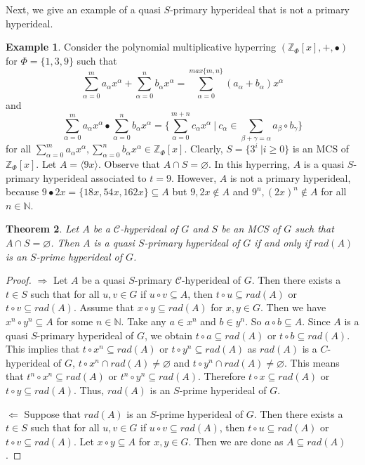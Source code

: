 \documentclass[preprint,review,10pt]{amsart}
\newtheorem{theorem}{Theorem}[section]
\theoremstyle{definition}
\newtheorem{example}[theorem]{Example}
\theoremstyle{remark}
\numberwithin{equation}{section}
\begin{document}
Next, we give an example of a quasi $S$-primary hyperideal that is not a primary hyperideal.
\begin{example} \label{salami}
Consider the polynomial multiplicative hyperring $(\mathbb{Z}_{\Phi}[x],+,\bullet)$ for $\Phi=\{1,3,9\}$ such that 
\[\sum_{\alpha=0}^m a_{\alpha}x^{\alpha}+\sum_{\alpha=0}^n b_{\alpha}x^{\alpha}=\sum_{\alpha=0}^{max\{m,n\}} (a_{\alpha}+b_{\alpha})x^{\alpha}\]
and
\[\sum_{\alpha=0}^m a_{\alpha}x^{\alpha}\bullet\sum_{\alpha=0}^n b_{\alpha}x^{\alpha}=\{\sum_{\alpha=0}^{m+n} c_{\alpha}x^{\alpha} \ \vert \ c_{\alpha} \in \sum_{\beta+\gamma={\alpha}} a_{\beta} \circ b_{\gamma}\}\]
for all $\sum_{\alpha=0}^m a_{\alpha}x^{\alpha}, \sum_{\alpha=0}^n b_{\alpha}x^{\alpha} \in \mathbb{Z}_{\Phi}[x]$. Clearly, $S=\{3^i \ \vert i \geq 0 \}$ is an MCS of $\mathbb{Z}_{\Phi}[x]$. Let $A=\langle 9x \rangle$.   Observe that $A \cap S=\varnothing$. In this hyperring, $A$ is a quasi $S$-primary hyperideal associated to $t=9$. However, $A$ is not a primary hyperideal, because $9 \bullet 2x=\{18x,54x,162x\} \subseteq A$ but $9,2x \notin A$ and $9^n, (2x)^n \notin A$ for all $n \in \mathbb{N}$.
\end{example}
\begin{theorem} \label{11}
Let $A$ be a  $\mathcal{C}$-hyperideal of $G$ and $S$ be an MCS of $G$ such that $A \cap S=\varnothing$. Then  $A$ is a quasi $S$-primary hyperideal of $G$ if and only if  $rad(A)$ is an $S$-prime hyperideal of $G$. 
\end{theorem}
\begin{proof}
$\Longrightarrow$  Let $A$ be a quasi $S$-primary $\mathcal{C}$-hyperideal of $G$. Then there exists a $t \in S$ such that for all $u,v \in G$ if $u \circ v \subseteq A$, then $t \circ u \subseteq rad(A)$ or $t \circ v \subseteq rad(A)$. Assume that $x\circ y \subseteq rad(A)$ for $x,y \in G$. Then we have $x^n \circ y^n \subseteq A$ for some $n \in \mathbb{N}$. Take any $a \in x^n$ and $b \in y^n$. So $a \circ b \subseteq A$. Since  $A$ is a quasi $S$-primary hyperideal of $G$, we obtain $t \circ a \subseteq rad(A)$ or $t \circ b \subseteq rad(A)$.  This implies that $t \circ x^n \subseteq rad(A)$ or $t \circ y^n \subseteq rad(A)$ as $rad(A)$ is a $C$-hyperideal of $G$, $t \circ x^n \cap rad(A) \neq \varnothing$ and $t \circ y^n \cap rad(A) \neq \varnothing$. This means that $t^n \circ x^n \subseteq rad(A)$ or $t^n \circ y^n \subseteq rad(A)$. Therefore $t \circ x \subseteq rad(A)$ or $t \circ y \subseteq rad(A)$. Thus, $rad(A)$ is an $S$-prime hyperideal of $G$. 

$\Longleftarrow$  Suppose that $rad(A)$ is an $S$-prime hyperideal of $G$. Then there exists a $t \in S$ such that for all $u,v \in G$ if $u \circ v \subseteq rad(A)$, then $t \circ u \subseteq rad(A)$ or $t \circ v \subseteq rad(A)$. Let $x \circ y \subseteq A$ for $x,y \in G$. Then we are done as $A \subseteq rad(A)$. 
\end{proof}
\end{document}
